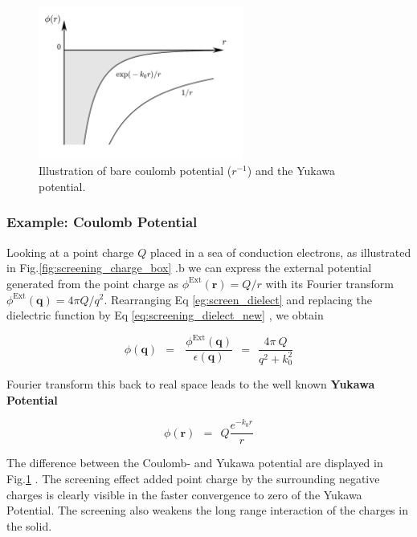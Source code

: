 \documentclass[10pt]{report}
\numberwithin{equation}{chapter}
\newcommand{\myRef}[1]{
  Fig.\ref{#1}
}
\newcommand{\refEq}[1]{
  Eq  \ref{#1}
}
\begin{document}
\begin{figure}
  \centering
  \includegraphics[width=0.6\textwidth]{../img/screening_yukawa.pdf}
  \caption{Illustration of bare coulomb potential ($r^{-1}$) and the Yukawa potential.}
  \label{fig:screening_yukawa}
\end{figure}



\subsubsection{Example: Coulomb Potential}

Looking at a point charge $Q$ placed in a sea of conduction electrons, as illustrated in \myRef{fig:screening_charge_box}.b we can express the external potential generated from the point charge as $\phi^\text{Ext}(\mathbf{r}) = Q/r$ with its Fourier transform  $\phi^\text{Ext}(\mathbf{q}) = 4\pi Q/q^2$. Rearranging \refEq{eg:screen_dielect} and replacing the dielectric function by \refEq{eq:screening_dielect_new}, we obtain

\begin{equation}
  \phi(\mathbf{q}) ~~=~~~\frac{\phi^\text{Ext}(\mathbf{q})}{\epsilon(\mathbf{q})} 
  ~~=~~ \frac{4\pi\ Q}{q^2 + k^2_0}
\end{equation}

Fourier transform this back to real space leads to the well known \textbf{Yukawa Potential} 

\begin{equation}
  \phi(\mathbf{r}) ~~=~~ Q \frac{e^{-k_0 r}}{r}
\end{equation}

The difference between the Coulomb- and Yukawa potential are displayed in \myRef{fig:screening_yukawa}. The screening effect added point charge by the surrounding negative charges is clearly visible in the faster convergence to zero of the Yukawa Potential. The screening also weakens the long range interaction of the charges in the solid.
\end{document}
